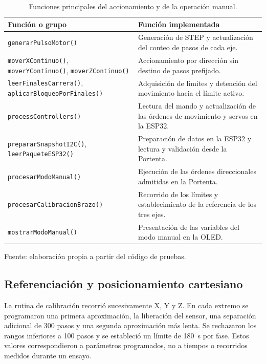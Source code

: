 \begin{table}[H]
    \centering
    \caption{Funciones principales del accionamiento y de la operación manual.}
    \label{tab:fase4_funciones}
    \begin{tabular}{p{}p{}}
        \hline
        Función o grupo & Función implementada \\
        \hline
        \texttt{generarPulsoMotor()} & Generación de STEP y actualización del conteo de pasos de cada eje. \\
        \texttt{moverXContinuo()}, \texttt{moverYContinuo()}, \texttt{moverZContinuo()} & Accionamiento por dirección sin destino de pasos prefijado. \\
        \texttt{leerFinalesCarrera()}, \texttt{aplicarBloqueoPorFinales()} & Adquisición de límites y detención del movimiento hacia el límite activo. \\
        \texttt{processControllers()} & Lectura del mando y actualización de las órdenes de movimiento y servos en la ESP32. \\
        \texttt{prepararSnapshotI2C()}, \texttt{leerPaqueteESP32()} & Preparación de datos en la ESP32 y lectura y validación desde la Portenta. \\
        \texttt{procesarModoManual()} & Ejecución de las órdenes direccionales admitidas en la Portenta. \\
        \texttt{procesarCalibracionBrazo()} & Recorrido de los límites y establecimiento de la referencia de los tres ejes. \\
        \texttt{mostrarModoManual()} & Presentación de las variables del modo manual en la OLED. \\
        \hline
    \end{tabular}
    \par\small\raggedright Fuente: elaboración propia a partir del código de pruebas.
\end{table}

\subsection{Referenciación y posicionamiento cartesiano}

La rutina de calibración recorrió sucesivamente X, Y y Z. En cada extremo se programaron una primera aproximación, la liberación del sensor, una separación adicional de 300 pasos y una segunda aproximación más lenta. Se rechazaron los rangos inferiores a 100 pasos y se estableció un límite de 180~s por fase. Estos valores correspondieron a parámetros programados, no a tiempos o recorridos medidos durante un ensayo.

